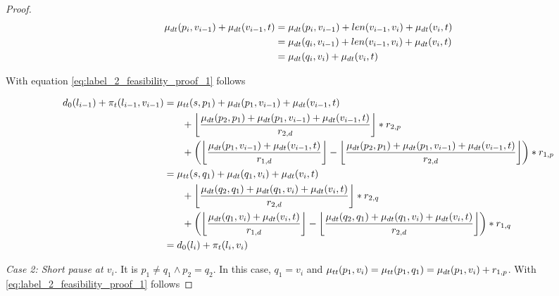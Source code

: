 \begin{proof}
	\begin{align}
		\begin{split}\label{eq:label_2_feasibility_proof_2}
			\mu_{dt}(p_i,v_{i-1}) + \mu_{dt}(v_{i-1},t) & = \mu_{dt}(p_i,v_{i-1}) + len(v_{i-1},v_i) + \mu_{dt}(v_i,t) \\
			& = \mu_{dt}(q_i,v_{i-1}) + len(v_{i-1},v_i) + \mu_{dt}(v_i,t) \\
			& = \mu_{dt}(q_i,v_i) + \mu_{dt}(v_i,t)
		\end{split}
	\end{align}

	With equation \ref{eq:label_2_feasibility_proof_1} follows

	\begin{align}
		\begin{split}\label{eq:label_2_feasibility_proof_3}
			d_0(l_{i-1}) + \pi_t(l_{i-1},v_{i-1}) &= \traveltime(s, p_1) + \drivingtime(p_1,v_{i-1}) + \drivingtime(v_{i-1},t)\\
			& \phantom{{}=1} + \floor*{ \frac{\drivingtime(p_2,p_1) + \drivingtime(p_1,v_{i-1}) + \drivingtime(v_{i-1},t)}{\restr_{2,d}} } * \restr_{2,p}\\
			& \phantom{{}=1} + \left( \floor*{ \frac{\drivingtime(p_1,v_{i-1})  + \drivingtime(v_{i-1},t)}{\restr_{1,d}} } - \floor*{ \frac{\drivingtime(p_2,p_1) + \drivingtime(p_1,v_{i-1}) + \drivingtime(v_{i-1},t)}{\restr_{2,d}} }\right) * \restr_{1,p}\\
			&= \traveltime(s, q_1) + \drivingtime(q_1,v_{i}) + \drivingtime(v_{i},t)\\
			& \phantom{{}=1} + \floor*{ \frac{\drivingtime(q_2,q_1) + \drivingtime(q_1,v_{i}) + \drivingtime(v_{i},t)}{\restr_{2,d}} } * \restr_{2,q}\\
			& \phantom{{}=1} + \left( \floor*{ \frac{\drivingtime(q_1,v_{i})  + \drivingtime(v_{i},t)}{\restr_{1,d}} } - \floor*{ \frac{\drivingtime(q_2,q_1) + \drivingtime(q_1,v_{i}) + \drivingtime(v_{i},t)}{\restr_{2,d}} }\right) * \restr_{1,q}\\
			&=d_0(l_{i}) + \pi_t(l_{i},v_{i})
		\end{split}
	\end{align}

	\emph{Case 2: Short pause at $v_i$}. It is $p_1 \neq q_1 \land p_2 = q_2$. In this case, $q_1 = v_i$ and $\mu_{tt}(p_1,v_i) = \mu_{tt}(p_1,q_1) = \mu_{dt}(p_1,v_i) + r_{1,p}$. With \ref{eq:label_2_feasibility_proof_1} follows


\end{proof}
